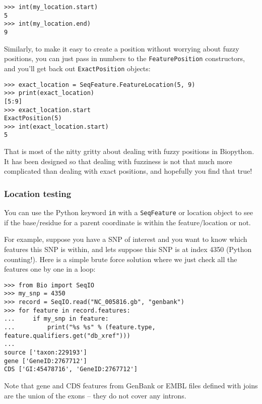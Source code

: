 \begin{verbatim}
>>> int(my_location.start)
5
>>> int(my_location.end)
9
\end{verbatim}

Similarly, to make it easy to create a position without worrying about fuzzy positions, you can just pass in numbers to the \verb|FeaturePosition| constructors, and you'll get back out \verb|ExactPosition| objects:

\begin{verbatim}
>>> exact_location = SeqFeature.FeatureLocation(5, 9)
>>> print(exact_location)
[5:9]
>>> exact_location.start
ExactPosition(5)
>>> int(exact_location.start)
5
\end{verbatim}

That is most of the nitty gritty about dealing with fuzzy positions in Biopython.
It has been designed so that dealing with fuzziness is not that much more
complicated than dealing with exact positions, and hopefully you find that true!

\subsubsection{Location testing}

You can use the Python keyword \verb|in| with a \verb|SeqFeature| or location
object to see if the base/residue for a parent coordinate is within the
feature/location or not.

For example, suppose you have a SNP of interest and you want to know which
features this SNP is within, and lets suppose this SNP is at index 4350
(Python counting!). Here is a simple brute force solution where we just
check all the features one by one in a loop:

\begin{verbatim}
>>> from Bio import SeqIO
>>> my_snp = 4350
>>> record = SeqIO.read("NC_005816.gb", "genbank")
>>> for feature in record.features:
...     if my_snp in feature:
...         print("%s %s" % (feature.type, feature.qualifiers.get("db_xref")))
...
source ['taxon:229193']
gene ['GeneID:2767712']
CDS ['GI:45478716', 'GeneID:2767712']
\end{verbatim}

Note that gene and CDS features from GenBank or EMBL files defined with joins
are the union of the exons -- they do not cover any introns.


